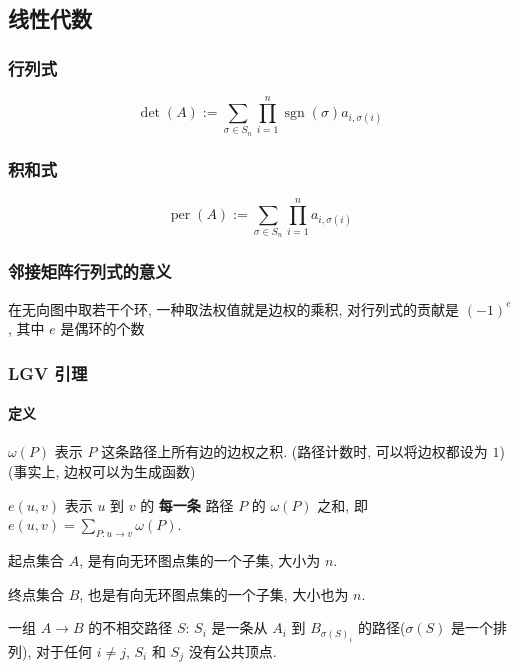 \subsection{线性代数}
\label{ssec:lalg}

\subsubsection{行列式}

\begin{equation}
    \operatorname{det}(A):=\sum_{\sigma\in S_n}\prod_{i=1}^n \operatorname{sgn}(\sigma) a_{i,\sigma(i)}
\end{equation}

\subsubsection{积和式}

\begin{equation}
    \operatorname{per}(A):=\sum_{\sigma\in S_n}\prod_{i=1}^n a_{i,\sigma(i)}
\end{equation}

\subsubsection{邻接矩阵行列式的意义}

在无向图中取若干个环, 一种取法权值就是边权的乘积, 对行列式的贡献是 \((-1)^{e}\), 其中 \(e\) 是偶环的个数

\subsubsection{LGV 引理}

\paragraph{定义}

\(\omega(P)\) 表示 \(P\) 这条路径上所有边的边权之积. (路径计数时, 可以将边权都设为 \(1\)) (事实上, 边权可以为生成函数)

\(e(u, v)\) 表示 \(u\) 到 \(v\) 的 \textbf{每一条} 路径 \(P\) 的 \(\omega(P)\) 之和, 即 \(e(u, v)=\sum\limits_{P:u\rightarrow v}\omega(P)\).

起点集合 \(A\), 是有向无环图点集的一个子集, 大小为 \(n\).

终点集合 \(B\), 也是有向无环图点集的一个子集, 大小也为 \(n\).

一组 \(A\rightarrow B\) 的不相交路径 \(S\): \(S_i\) 是一条从 \(A_i\) 到 \(B_{\sigma(S)_i}\) 的路径(\(\sigma(S)\) 是一个排列), 对于任何 \(i\ne j\), \(S_i\) 和 \(S_j\) 没有公共顶点.

